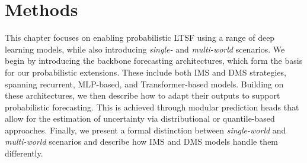 \documentclass[a4paper,oneside,bibliography=totoc]{scrbook}
\begin{document}
\chapter{Methods}
\label{ch:methods}
This chapter focuses on enabling probabilistic LTSF using a range of deep learning models, while also introducing \textit{single-} and \textit{multi-world} scenarios.
We begin by introducing the backbone forecasting architectures, which form the basis for our probabilistic extensions. These include both IMS and DMS strategies, spanning recurrent, MLP-based, and Transformer-based models.
Building on these architectures, we then describe how to adapt their outputs to support probabilistic forecasting. This is achieved through modular prediction heads that allow for the estimation of uncertainty via distributional or quantile-based approaches. %
Finally, we present a formal distinction between \textit{single-world} and \textit{multi-world} scenarios and describe how IMS and DMS models handle them differently.



\end{document}
